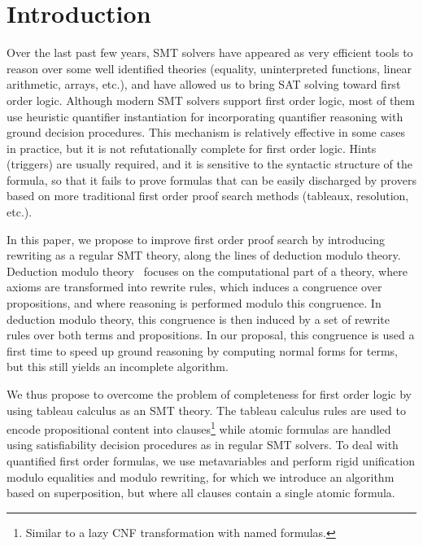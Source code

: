 
\section{Introduction}

Over the last past few years, SMT solvers have appeared as very efficient tools
to reason over some well identified theories (equality, uninterpreted functions,
linear arithmetic, arrays, etc.), and have allowed us to bring SAT solving
toward first order logic.  Although modern SMT solvers support first order
logic, most of them use heuristic quantifier instantiation for incorporating
quantifier reasoning with ground decision procedures. This mechanism is
relatively effective in some cases in practice, but it is not refutationally
complete for first order logic. Hints (triggers) are usually required, and it is
sensitive to the syntactic structure of the formula, so that it fails to prove
formulas that can be easily discharged by provers based on more traditional
first order proof search methods (tableaux, resolution, etc.).

In this paper, we propose to improve first order proof search by introducing
rewriting as a regular SMT theory, along the lines of
deduction modulo theory. Deduction modulo theory~\cite{DA03} focuses on the
computational part of a theory, where axioms are transformed into rewrite rules,
which induces a congruence over propositions, and where reasoning is performed
modulo this congruence. In deduction modulo theory, this congruence is then
induced by a set of rewrite rules over both terms and propositions. In our
proposal, this congruence is used a first time to speed up ground reasoning
by computing normal forms for terms, but this still yields an incomplete
algorithm.

We thus propose to overcome the problem of completeness for first order logic by
using tableau calculus as an SMT theory. The tableau calculus rules are used to
encode propositional content into clauses\footnote{Similar to a lazy CNF
transformation with named formulas.} while atomic formulas are handled using
satisfiability decision procedures as in regular SMT solvers. To deal with
quantified first order formulas, we use metavariables and perform rigid
unification modulo equalities and modulo rewriting, for which we introduce an
algorithm based on superposition, but where all clauses contain a single atomic
formula.


